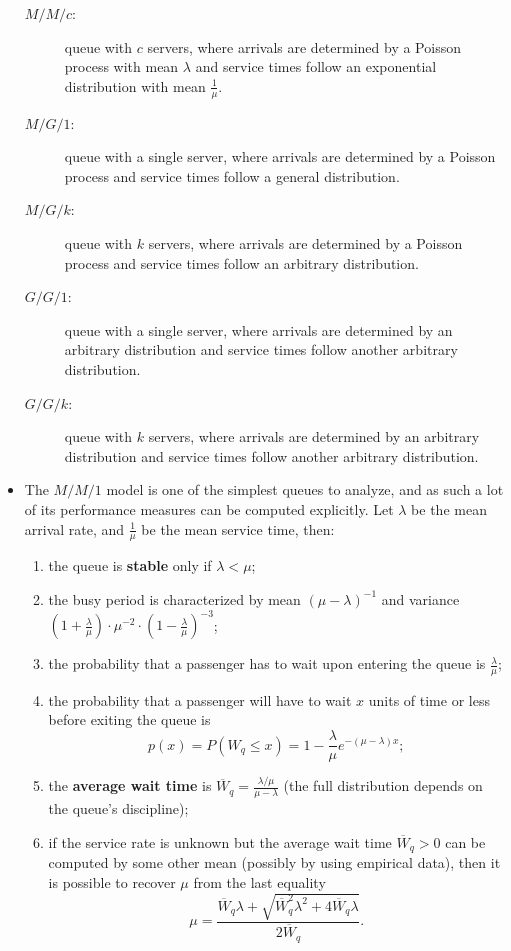 \begin{itemize}[noitemsep]
\begin{description}
\item[$M/M/c$:] queue with $c$ servers, where arrivals are determined by a Poisson process with mean $\lambda$ and  service times follow an exponential distribution with mean $\frac{1}{\mu}$.
\item[$M/G/1$:] queue with a single server, where arrivals are determined by a Poisson process and service times follow a general distribution.
\item[$M/G/k$:] queue with $k$ servers, where arrivals are determined by a Poisson process and service times follow an arbitrary distribution.
\item[$G/G/1$:] queue with a single server, where arrivals are determined by an arbitrary distribution and service times follow another arbitrary distribution.
\item[$G/G/k$:] queue with $k$ servers, where arrivals are determined by an arbitrary distribution and service times follow another arbitrary distribution.
\end{description}
\item The $M/M/1$ model is one of the simplest queues to analyze, and as such a lot of its performance measures can be computed explicitly. Let $\lambda$ be the mean arrival rate, and $\frac{1}{\mu}$ be the mean service time, then:
\begin{enumerate}
\item the queue is \textbf{stable} only if $\lambda<\mu$;
\item the busy period is characterized by mean $(\mu-\lambda)^{-1}$ and variance $\left(1+\frac{\lambda}{\mu}\right)\cdot\mu^{-2}\cdot \left(1-\frac{\lambda}{\mu}\right)^{-3}$;
\item the probability that a passenger has to wait upon entering the queue is $\frac{\lambda}{\mu}$;
\item the probability that a passenger will have to wait $x$ units of time or less before exiting the queue is $$p(x)=P(W_q\leq x)=1-\frac{\lambda}{\mu} e^{-(\mu-\lambda)x};$$
\item the \textbf{average wait time} is $\overline{W}_q=\frac{\lambda/\mu}{\mu-\lambda}$ (the full distribution depends on the queue's discipline);
\item if the service rate is unknown but the average wait time $\overline{W}_q>0$ can be computed by some other mean (possibly by using empirical data), then it is possible to recover $\mu$ from the last equality $$\mu=\frac{\overline{W}_q\lambda+\sqrt{\overline{W}_q^2\lambda^2+4\overline{W}_q\lambda}}{2\overline{W}_q}.$$

\end{enumerate}
\end{itemize}
